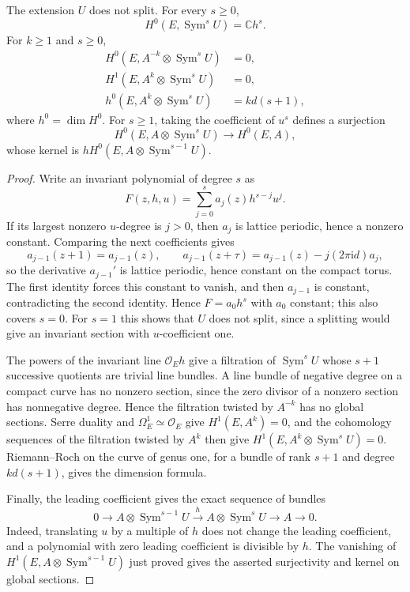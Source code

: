 \begin{lemma}\label{lem:elliptic-unipotent-symmetric-cohomology}
The extension $U$ does not split. For every $s\geq0$,
\[
 H^0(E,\operatorname{Sym}^sU)=\mathbb C h^s.
\]
For $k\geq1$ and $s\geq0$,
\[
 \begin{aligned}
 H^0(E,A^{-k}\otimes\operatorname{Sym}^sU)&=0,\\
 H^1(E,A^k\otimes\operatorname{Sym}^sU)&=0,\\
 h^0(E,A^k\otimes\operatorname{Sym}^sU)&=kd(s+1),
 \end{aligned}
\]
where $h^0=\dim H^0$. For $s\geq1$, taking the coefficient of $u^s$ defines a surjection
\[
 H^0(E,A\otimes\operatorname{Sym}^sU)\longrightarrow H^0(E,A),
\]
whose kernel is $hH^0(E,A\otimes\operatorname{Sym}^{s-1}U)$.
\end{lemma}
\begin{proof}
Write an invariant polynomial of degree $s$ as
\[
 F(z,h,u)=\sum_{j=0}^s a_j(z)h^{s-j}u^j.
\]
If its largest nonzero $u$-degree is $j>0$, then $a_j$ is lattice periodic, hence a nonzero constant. Comparing the next coefficients gives
\[
 a_{j-1}(z+1)=a_{j-1}(z),\qquad
 a_{j-1}(z+\tau)=a_{j-1}(z)-j(2\pi\mathrm{i}d)a_j,
\]
so the derivative $a_{j-1}'$ is lattice periodic, hence constant on the compact torus. The first identity forces this constant to vanish, and then $a_{j-1}$ is constant, contradicting the second identity. Hence $F=a_0h^s$ with $a_0$ constant; this also covers $s=0$. For $s=1$ this shows that $U$ does not split, since a splitting would give an invariant section with $u$-coefficient one.

The powers of the invariant line $\mathcal O_Eh$ give a filtration of $\operatorname{Sym}^sU$ whose $s+1$ successive quotients are trivial line bundles. A line bundle of negative degree on a compact curve has no nonzero section, since the zero divisor of a nonzero section has nonnegative degree. Hence the filtration twisted by $A^{-k}$ has no global sections. Serre duality and $\Omega_E^1\simeq\mathcal O_E$ give $H^1(E,A^k)=0$, and the cohomology sequences of the filtration twisted by $A^k$ then give $H^1(E,A^k\otimes\operatorname{Sym}^sU)=0$. Riemann--Roch on the curve of genus one, for a bundle of rank $s+1$ and degree $kd(s+1)$, gives the dimension formula.

Finally, the leading coefficient gives the exact sequence of bundles
\[
 0\longrightarrow A\otimes\operatorname{Sym}^{s-1}U
 \xrightarrow{\ h\ }A\otimes\operatorname{Sym}^sU
 \longrightarrow A\longrightarrow0.
\]
Indeed, translating $u$ by a multiple of $h$ does not change the leading coefficient, and a polynomial with zero leading coefficient is divisible by $h$. The vanishing of $H^1(E,A\otimes\operatorname{Sym}^{s-1}U)$ just proved gives the asserted surjectivity and kernel on global sections.
\end{proof}

